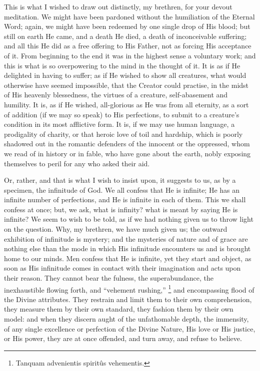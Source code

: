 This is what I wished to draw out distinctly, my brethren, for your
devout meditation. We might have been pardoned without the humiliation
of the Eternal Word; again, we might have been redeemed by one single
drop of His blood; but still on earth He came, and a death He died, a
death of inconceivable suffering; and all this He did as a free
offering to His Father, not as forcing His acceptance of it. From
beginning to the end it was in the highest sense a voluntary work; and
this is what is so overpowering to the mind in the thought of it. It
is as if He delighted in having to suffer; as if He wished to show all
creatures, what would otherwise have seemed impossible, that the
Creator could practise, in the midst of His heavenly blessedness, the
virtues of a creature, self-abasement and humility. It is, as if He
wished, all-glorious as He was from all eternity, as a sort of
addition (if we may so speak) to His perfections, to submit to a
creature's condition in its most afflictive form. It is, if we may use
human language, a prodigality of charity, or that heroic love of toil
and hardship, which is poorly shadowed out in the romantic defenders
of the innocent or the oppressed, whom we read of in history or in
fable, who have gone about the earth, nobly exposing themselves to
peril for any who asked their aid.

Or, rather, and that is what I wish to insist upon, it suggests to
us, as by a specimen, the infinitude of God. We all confess that He is
infinite; He has an infinite number of perfections, and He is infinite
in each of them. This we shall confess at once; but, we ask, what is
infinity? what is meant by saying He is infinite? We seem to wish to
be told, as if we had nothing given us to throw light on the question.
Why, my brethren, we have much given us; the outward exhibition of
infinitude is mystery; and the mysteries of nature and of grace are
nothing else than the mode in which His infinitude encounters us and
is brought home to our minds. Men confess that He is infinite, yet
they start and object, as soon as His infinitude comes in contact with
their imagination and acts upon their reason. They cannot bear the
fulness, the superabundance, the inexhaustible flowing forth, and
``vehement rushing,'' \footnote{Tanquam advenientis spiritûs vehementis.}
and encompassing flood of the Divine attributes. They restrain and
limit them to their own comprehension, they measure them by their own
standard, they fashion them by their own model: and when they discern
aught of the unfathomable depth, the immensity, of any single
excellence or perfection of the Divine Nature, His love or His
justice, or His power, they are at once offended, and turn away, and
refuse to believe.


